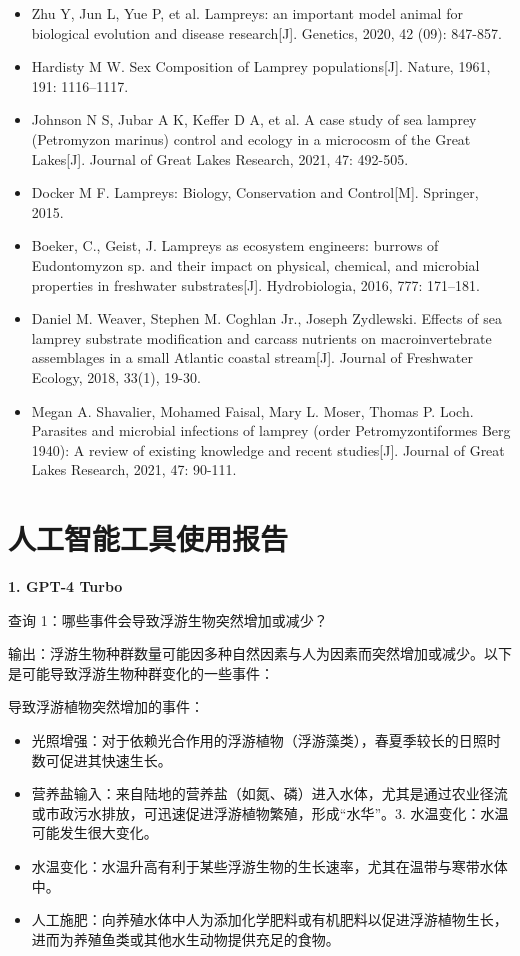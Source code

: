 \documentclass[11pt,a4paper]{ctexart}
\begin{document}
\begin{itemize}
\item[{[1]}] Zhu Y, Jun L, Yue P, et al. Lampreys: an important model animal for biological evolution and disease research[J]. Genetics, 2020, 42 (09): 847-857.
\item[{[2]}] Hardisty M W. Sex Composition of Lamprey populations[J]. Nature, 1961, 191: 1116--1117.
\item[{[3]}] Johnson N S, Jubar A K, Keffer D A, et al. A case study of sea lamprey (Petromyzon marinus) control and ecology in a microcosm of the Great Lakes[J]. Journal of Great Lakes Research, 2021, 47: 492-505.
\item[{[4]}] Docker M F. Lampreys: Biology, Conservation and Control[M]. Springer, 2015.
\item[{[5]}] Boeker, C., Geist, J. Lampreys as ecosystem engineers: burrows of Eudontomyzon sp. and their impact on physical, chemical, and microbial properties in freshwater substrates[J]. Hydrobiologia, 2016, 777: 171--181.
\item[{[6]}] Daniel M. Weaver, Stephen M. Coghlan Jr., Joseph Zydlewski. Effects of sea lamprey substrate modification and carcass nutrients on macroinvertebrate assemblages in a small Atlantic coastal stream[J]. Journal of Freshwater Ecology, 2018, 33(1), 19-30.
\item[{[7]}] Megan A. Shavalier, Mohamed Faisal, Mary L. Moser, Thomas P. Loch. Parasites and microbial infections of lamprey (order Petromyzontiformes Berg 1940): A review of existing knowledge and recent studies[J]. Journal of Great Lakes Research, 2021, 47: 90-111.
\end{itemize}

\section*{人工智能工具使用报告}

\textbf{1. GPT-4 Turbo}

查询 1：哪些事件会导致浮游生物突然增加或减少？

输出：浮游生物种群数量可能因多种自然因素与人为因素而突然增加或减少。以下是可能导致浮游生物种群变化的一些事件：

导致浮游植物突然增加的事件：

\begin{itemize}
\item 光照增强：对于依赖光合作用的浮游植物（浮游藻类），春夏季较长的日照时数可促进其快速生长。
\item 营养盐输入：来自陆地的营养盐（如氮、磷）进入水体，尤其是通过农业径流或市政污水排放，可迅速促进浮游植物繁殖，形成“水华”。3. 水温变化：水温可能发生很大变化。
\item 水温变化：水温升高有利于某些浮游生物的生长速率，尤其在温带与寒带水体中。
\item 人工施肥：向养殖水体中人为添加化学肥料或有机肥料以促进浮游植物生长，进而为养殖鱼类或其他水生动物提供充足的食物。
\end{itemize}
\end{document}
